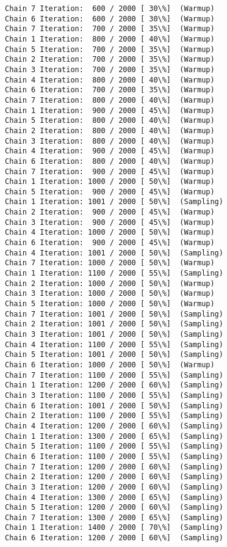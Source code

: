 \documentclass[11pt]{article}
\begin{document}
\begin{Verbatim}[commandchars=\\\{\}]
Chain 7 Iteration:  600 / 2000 [ 30\%]  (Warmup)
Chain 6 Iteration:  600 / 2000 [ 30\%]  (Warmup)
Chain 7 Iteration:  700 / 2000 [ 35\%]  (Warmup)
Chain 1 Iteration:  800 / 2000 [ 40\%]  (Warmup)
Chain 5 Iteration:  700 / 2000 [ 35\%]  (Warmup)
Chain 2 Iteration:  700 / 2000 [ 35\%]  (Warmup)
Chain 3 Iteration:  700 / 2000 [ 35\%]  (Warmup)
Chain 4 Iteration:  800 / 2000 [ 40\%]  (Warmup)
Chain 6 Iteration:  700 / 2000 [ 35\%]  (Warmup)
Chain 7 Iteration:  800 / 2000 [ 40\%]  (Warmup)
Chain 1 Iteration:  900 / 2000 [ 45\%]  (Warmup)
Chain 5 Iteration:  800 / 2000 [ 40\%]  (Warmup)
Chain 2 Iteration:  800 / 2000 [ 40\%]  (Warmup)
Chain 3 Iteration:  800 / 2000 [ 40\%]  (Warmup)
Chain 4 Iteration:  900 / 2000 [ 45\%]  (Warmup)
Chain 6 Iteration:  800 / 2000 [ 40\%]  (Warmup)
Chain 7 Iteration:  900 / 2000 [ 45\%]  (Warmup)
Chain 1 Iteration: 1000 / 2000 [ 50\%]  (Warmup)
Chain 5 Iteration:  900 / 2000 [ 45\%]  (Warmup)
Chain 1 Iteration: 1001 / 2000 [ 50\%]  (Sampling)
Chain 2 Iteration:  900 / 2000 [ 45\%]  (Warmup)
Chain 3 Iteration:  900 / 2000 [ 45\%]  (Warmup)
Chain 4 Iteration: 1000 / 2000 [ 50\%]  (Warmup)
Chain 6 Iteration:  900 / 2000 [ 45\%]  (Warmup)
Chain 4 Iteration: 1001 / 2000 [ 50\%]  (Sampling)
Chain 7 Iteration: 1000 / 2000 [ 50\%]  (Warmup)
Chain 1 Iteration: 1100 / 2000 [ 55\%]  (Sampling)
Chain 2 Iteration: 1000 / 2000 [ 50\%]  (Warmup)
Chain 3 Iteration: 1000 / 2000 [ 50\%]  (Warmup)
Chain 5 Iteration: 1000 / 2000 [ 50\%]  (Warmup)
Chain 7 Iteration: 1001 / 2000 [ 50\%]  (Sampling)
Chain 2 Iteration: 1001 / 2000 [ 50\%]  (Sampling)
Chain 3 Iteration: 1001 / 2000 [ 50\%]  (Sampling)
Chain 4 Iteration: 1100 / 2000 [ 55\%]  (Sampling)
Chain 5 Iteration: 1001 / 2000 [ 50\%]  (Sampling)
Chain 6 Iteration: 1000 / 2000 [ 50\%]  (Warmup)
Chain 7 Iteration: 1100 / 2000 [ 55\%]  (Sampling)
Chain 1 Iteration: 1200 / 2000 [ 60\%]  (Sampling)
Chain 3 Iteration: 1100 / 2000 [ 55\%]  (Sampling)
Chain 6 Iteration: 1001 / 2000 [ 50\%]  (Sampling)
Chain 2 Iteration: 1100 / 2000 [ 55\%]  (Sampling)
Chain 4 Iteration: 1200 / 2000 [ 60\%]  (Sampling)
Chain 1 Iteration: 1300 / 2000 [ 65\%]  (Sampling)
Chain 5 Iteration: 1100 / 2000 [ 55\%]  (Sampling)
Chain 6 Iteration: 1100 / 2000 [ 55\%]  (Sampling)
Chain 7 Iteration: 1200 / 2000 [ 60\%]  (Sampling)
Chain 2 Iteration: 1200 / 2000 [ 60\%]  (Sampling)
Chain 3 Iteration: 1200 / 2000 [ 60\%]  (Sampling)
Chain 4 Iteration: 1300 / 2000 [ 65\%]  (Sampling)
Chain 5 Iteration: 1200 / 2000 [ 60\%]  (Sampling)
Chain 7 Iteration: 1300 / 2000 [ 65\%]  (Sampling)
Chain 1 Iteration: 1400 / 2000 [ 70\%]  (Sampling)
Chain 6 Iteration: 1200 / 2000 [ 60\%]  (Sampling)

\end{Verbatim}
\end{document}
